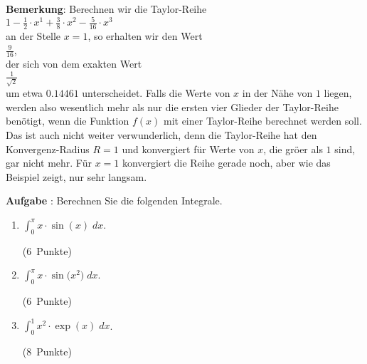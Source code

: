 \documentclass{article}
\newcounter{aufgabe}
\newcommand{\exercise}{\vspace*{0.3cm}
\stepcounter{aufgabe}

\noindent
\textbf{Aufgabe \arabic{aufgabe}}: }
\newcommand{\punkte}[1]{\hspace*{\fill} \mbox{(#1 Punkte)}}
\newcommand{\ds}{\displaystyle}
\begin{document}
\begin{enumerate}
      \noindent
      \textbf{Bemerkung}:  Berechnen wir die Taylor-Reihe
      \\[0.2cm]
      \hspace*{1.3cm}
      $\ds 1 - \frac{1}{2} \cdot x^1 + \frac{3}{8} \cdot x^2 - \frac{5}{16} \cdot x^3$
      \\[0.2cm]
      an der Stelle $x = 1$, so erhalten wir den Wert
      \\[0.2cm]
      \hspace*{1.3cm}
      $\ds \frac{9}{16}$, 
      \\[0.2cm]
      der sich  von dem exakten Wert
      \\[0.2cm]
      \hspace*{1.3cm}
      $\ds\frac{1}{\sqrt{2}}$ 
      \\[0.2cm]
      um etwa $0.14461$ unterscheidet.  Falls die Werte von $x$ in der N\"ahe von $1$ liegen,
      werden also wesentlich mehr als nur die ersten vier Glieder der Taylor-Reihe ben\"otigt,
      wenn die Funktion $f(x)$ mit einer Taylor-Reihe berechnet werden soll.  Das ist auch nicht
      weiter verwunderlich, denn die Taylor-Reihe hat den Konvergenz-Radius $R = 1$ und konvergiert
      f\"ur Werte von $x$, die gr\"o\3er als $1$ sind, gar nicht mehr.  F\"ur $x=1$ konvergiert die Reihe
      gerade noch, aber wie das Beispiel zeigt, nur sehr langsam.
\end{enumerate}
\pagebreak

\exercise
Berechnen Sie die folgenden Integrale.
\begin{enumerate}
\item $\ds\int_{0}^{\pi} x \cdot \sin(x) \; dx$.

      \punkte{6}
\item $\ds\int_{0}^{\pi} x \cdot \sin\bigl(x^2 \bigr) \; dx$.

      \punkte{6}
\item $\ds\int_{0}^{1} x^2 \cdot \exp(x) \; dx$.

      \punkte{8}
\end{enumerate}
\end{document}
